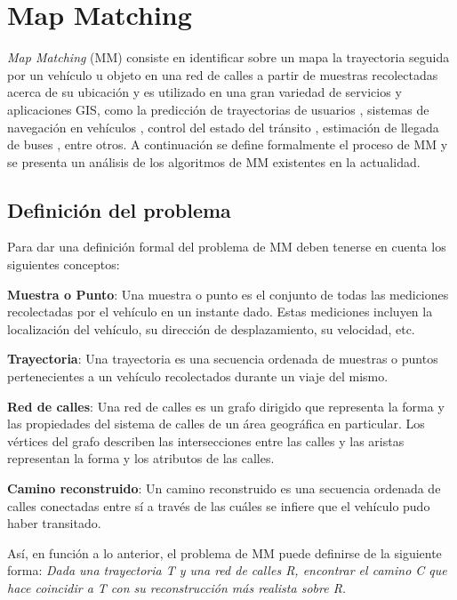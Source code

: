 \chapter{Map Matching}
\label{cap:4}

\emph{Map Matching} (MM) consiste en identificar sobre un mapa la trayectoria seguida por un vehículo u objeto en una red de calles a partir de muestras recolectadas acerca de su ubicación y es utilizado en una gran variedad de servicios y aplicaciones GIS, como la predicción de trayectorias de usuarios \cite{eisner2011algorithms}, sistemas de navegación en vehículos \cite{kim2001adaptive}, control del estado del tránsito \cite{thiagarajan2009vtrack}, estimación de llegada de buses \cite{thiagarajan2010cooperative}, entre otros. A continuación se define formalmente el proceso de MM y se presenta un análisis de los algoritmos de MM existentes en la actualidad.

\section{Definición del problema}

Para dar una definición formal del problema de MM deben tenerse en cuenta los siguientes conceptos:

\textbf{Muestra o Punto}: Una muestra o punto es el conjunto de todas las mediciones recolectadas por el vehículo en un instante dado. Estas mediciones incluyen la localización del vehículo, su dirección de desplazamiento, su velocidad, etc.

\textbf{Trayectoria}: Una trayectoria es una secuencia ordenada de muestras o puntos pertenecientes a un vehículo recolectados durante un viaje del mismo.

\textbf{Red de calles}: Una red de calles es un grafo dirigido que representa la forma y las propiedades del sistema de calles de un área geográfica en particular. Los vértices del grafo describen las intersecciones entre las calles y las aristas representan la forma y los atributos de las calles.

\textbf{Camino reconstruido}: Un camino reconstruido es una secuencia ordenada de calles conectadas entre sí a través de las cuáles se infiere que el vehículo pudo haber transitado.

Así, en función a lo anterior, el problema de MM puede definirse de la siguiente forma: \emph{Dada una trayectoria T y una red de calles R, encontrar el camino C que hace coincidir a T con su reconstrucción más realista sobre R.}

